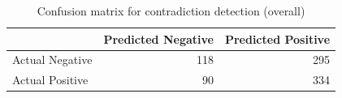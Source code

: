 \begin{table}
\caption{Confusion matrix for contradiction detection (overall)}
\label{tab:confusion_matrix}
\begin{tabular}{lrr}
\toprule
 & Predicted Negative & Predicted Positive \\
\midrule
Actual Negative & 118 & 295 \\
Actual Positive & 90 & 334 \\
\bottomrule
\end{tabular}
\end{table}
